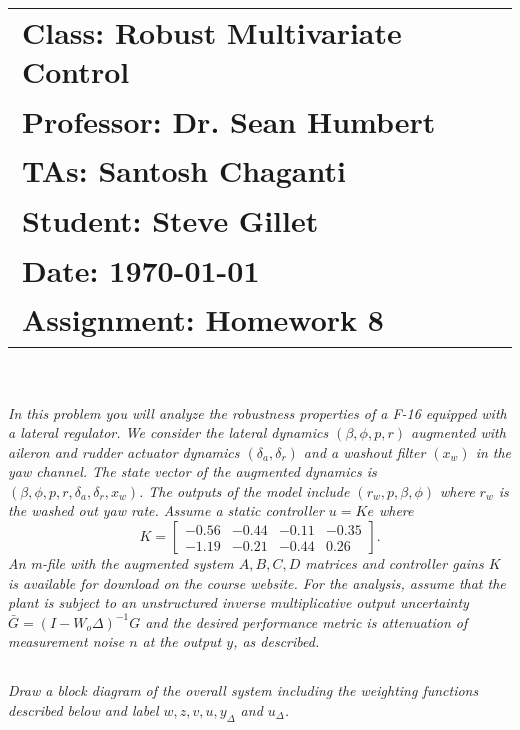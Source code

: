 \documentclass{article}
\begin{document}
\title{
    \begin{tabular}{@{}l@{}}
        \textbf{Class:} Robust Multivariate Control \\
        \textbf{Professor:} Dr. Sean Humbert \\
        \textbf{TAs:} Santosh Chaganti \\
        \textbf{Student:} Steve Gillet \\
        \textbf{Date:} \today \\
        \textbf{Assignment:} Homework 8
    \end{tabular}
}

\author{}
\date{}

\maketitle

\section{}
\textit{In this problem you will analyze the robustness properties of a F-16 equipped with a lateral regulator. We consider the lateral dynamics $(\beta, \phi, p, r)$ augmented with aileron and rudder actuator dynamics $\left(\delta_a, \delta_r\right)$ and a washout filter $\left(x_w\right)$ in the yaw channel. The state vector of the augmented dynamics is $\left(\beta, \phi, p, r, \delta_a, \delta_r, x_w\right)$. The outputs of the model include $\left(r_w, p, \beta, \phi\right)$ where $r_w$ is the washed out yaw rate. Assume a static controller $u = K e$ where
\[
K = \begin{bmatrix}
-0.56 & -0.44 & -0.11 & -0.35 \\
-1.19 & -0.21 & -0.44 & 0.26
\end{bmatrix}.
\]
An m-file with the augmented system $A, B, C, D$ matrices and controller gains $K$ is available for download on the course website. For the analysis, assume that the plant is subject to an unstructured inverse multiplicative output uncertainty $\bar{G} = (I - W_o \Delta)^{-1} G$ and the desired performance metric is attenuation of measurement noise $n$ at the output $y$, as described.}

\subsection{} 
\textit{Draw a block diagram of the overall system including the weighting functions described below and label $w, z, v, u, y_{\Delta}$ and $u_{\Delta}$.}
\end{document}
